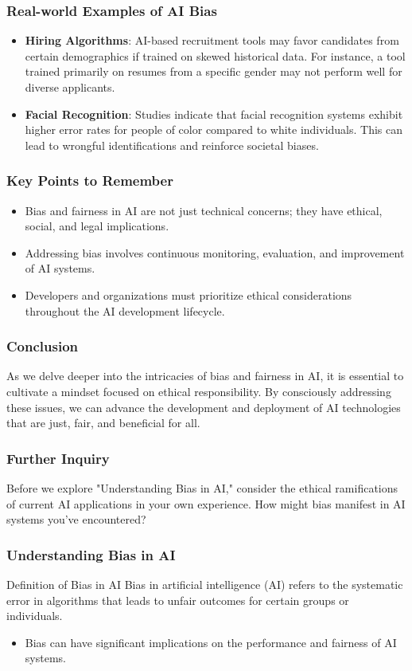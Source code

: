 \documentclass{beamer}
\begin{document}
\begin{frame}[fragile]
    \frametitle{Real-world Examples of AI Bias}
    \begin{itemize}
        \item \textbf{Hiring Algorithms}: AI-based recruitment tools may favor candidates from certain demographics if trained on skewed historical data. For instance, a tool trained primarily on resumes from a specific gender may not perform well for diverse applicants.
        \item \textbf{Facial Recognition}: Studies indicate that facial recognition systems exhibit higher error rates for people of color compared to white individuals. This can lead to wrongful identifications and reinforce societal biases.
    \end{itemize}
\end{frame}

\begin{frame}[fragile]
    \frametitle{Key Points to Remember}
    \begin{itemize}
        \item Bias and fairness in AI are not just technical concerns; they have ethical, social, and legal implications.
        \item Addressing bias involves continuous monitoring, evaluation, and improvement of AI systems.
        \item Developers and organizations must prioritize ethical considerations throughout the AI development lifecycle.
    \end{itemize}
\end{frame}

\begin{frame}[fragile]
    \frametitle{Conclusion}
    As we delve deeper into the intricacies of bias and fairness in AI, it is essential to cultivate a mindset focused on ethical responsibility. By consciously addressing these issues, we can advance the development and deployment of AI technologies that are just, fair, and beneficial for all.
\end{frame}

\begin{frame}[fragile]
    \frametitle{Further Inquiry}
    Before we explore "Understanding Bias in AI," consider the ethical ramifications of current AI applications in your own experience. How might bias manifest in AI systems you've encountered?
\end{frame}

\begin{frame}[fragile]
    \frametitle{Understanding Bias in AI}
    \begin{block}{Definition of Bias in AI}
        Bias in artificial intelligence (AI) refers to the systematic error in algorithms that leads to unfair outcomes for certain groups or individuals.
    \end{block}
    \begin{itemize}
        \item Bias can have significant implications on the performance and fairness of AI systems.
    \end{itemize}
\end{frame}
\end{document}
